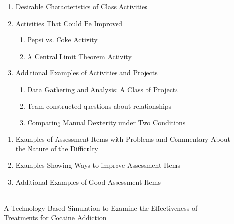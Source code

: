 \begin{description}
  \item[]\hfill
  \vspace{-.2in}
	\begin{enumerate}[leftmargin=1cm, itemsep=.2em]
	\item Desirable Characteristics of Class Activities
	\item Activities That Could Be Improved
		\begin{enumerate}[leftmargin=1cm, itemsep=.2em]
		\item Pepsi vs. Coke Activity
		\item A Central Limit Theorem Activity
		\end{enumerate}
	\item Additional Examples of Activities and Projects
		\begin{enumerate}[leftmargin=1cm, itemsep=.2em]
		\item Data Gathering and Analysis:  A Class of Projects
		\item Team constructed questions about relationships
		\item Comparing Manual Dexterity under Two Conditions\\
		\end{enumerate}
	\end{enumerate}
 
 \vspace{.25in}
\item[] \hfill
\vspace{-.2in}
	\begin{enumerate}[leftmargin=1cm, itemsep=.2em]
	\item Examples of Assessment Items with Problems and Commentary About the Nature of the Difficulty
	\item Examples Showing Ways to improve Assessment Items
	\item Additional Examples of Good Assessment Items\\
	\end{enumerate}
  
  \vspace{.25in}
\item[] \hfill \\
\vspace{-.1in}
A Technology-Based Simulation to Examine the Effectiveness of Treatments for Cocaine Addiction\\


\end{description}
